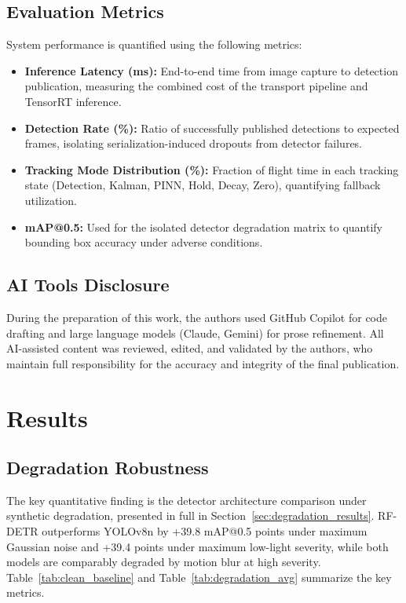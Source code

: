 \documentclass[11pt,letterpaper]{article}
\begin{document}
\subsection{Evaluation Metrics}

System performance is quantified using the following metrics:
\begin{itemize}
    \item \textbf{Inference Latency (ms):} End-to-end time from image capture to detection publication, measuring the combined cost of the transport pipeline and TensorRT inference.
    \item \textbf{Detection Rate (\%):} Ratio of successfully published detections to expected frames, isolating serialization-induced dropouts from detector failures.
    \item \textbf{Tracking Mode Distribution (\%):} Fraction of flight time in each tracking state (Detection, Kalman, PINN, Hold, Decay, Zero), quantifying fallback utilization.
    \item \textbf{mAP@0.5:} Used for the isolated detector degradation matrix to quantify bounding box accuracy under adverse conditions.
\end{itemize}

\subsection{AI Tools Disclosure}

During the preparation of this work, the authors used GitHub Copilot
for code drafting and large language models (Claude, Gemini) for prose
refinement.  All AI-assisted content was reviewed, edited, and
validated by the authors, who maintain full responsibility for the
accuracy and integrity of the final publication.

\section{Results}
\label{sec:results}

\subsection{Degradation Robustness}

The key quantitative finding is the detector architecture comparison under synthetic degradation, presented in full in Section~\ref{sec:degradation_results}. RF-DETR outperforms YOLOv8n by +39.8 mAP@0.5 points under maximum Gaussian noise and +39.4 points under maximum low-light severity, while both models are comparably degraded by motion blur at high severity. Table~\ref{tab:clean_baseline} and Table~\ref{tab:degradation_avg} summarize the key metrics.
\end{document}

